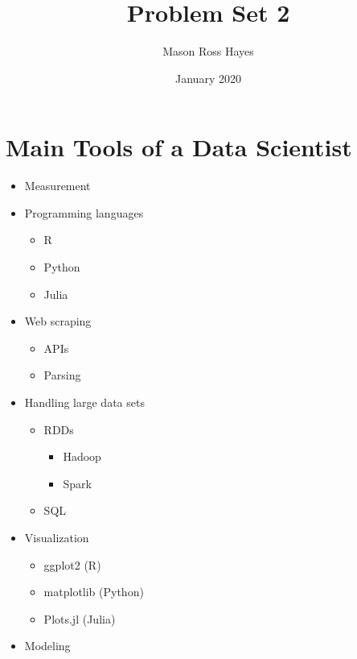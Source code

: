 \documentclass{article}
\title{Problem Set 2}
\author{Mason Ross Hayes}
\date{January 2020}
\begin{document}
\maketitle

\section{Main Tools of a Data Scientist}

\begin{itemize}
    \item Measurement
    \item Programming languages
    \begin{itemize}
        \item R
        \item Python
        \item Julia
    \end{itemize}
    \item Web scraping
    \begin{itemize}
        \item APIs
        \item Parsing
    \end{itemize}
    \item Handling large data sets
    \begin{itemize}
        \item RDDs
        \begin{itemize}
            \item Hadoop
            \item Spark
        \end{itemize}
        \item SQL
    \end{itemize}
    \item Visualization
    \begin{itemize}
        \item ggplot2 (R)
        \item matplotlib (Python)
        \item Plots.jl (Julia)
    \end{itemize}
    \item Modeling
\end{itemize}
\end{document}
